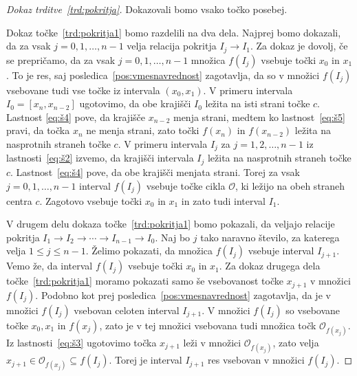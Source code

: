 \documentclass[../TG_magistrsko_delo_sections.tex]{subfiles}
\begin{document}
\begin{proof}[Dokaz trditve~\ref{trd:pokritja}]
Dokazovali bomo vsako točko posebej. 

Dokaz točke~\ref{trd:pokritja1} bomo razdelili na dva dela. Najprej bomo dokazali, da za vsak $j = 0, 1, \dots, n-1$ velja relacija pokritja $I_j \to I_1$. Za dokaz je dovolj, če se prepričamo, da za vsak $j=0, 1, \dots, n-1$ množica $f(I_j)$ vsebuje točki $x_0$ in $x_1$. To je res, saj posledica~\ref{pos:vmesnavrednost} zagotavlja, da so v množici $f(I_j)$ vsebovane tudi vse točke iz intervala $(x_0, x_1)$. V primeru intervala $I_0 = [x_n, x_{n-2}]$ ugotovimo, da obe krajišči $I_0$ ležita na isti strani točke $c$. Lastnost \ref{eq:š4} pove, da krajišče $x_{n-2}$ menja strani, medtem ko lastnost~\ref{eq:š5} pravi, da točka $x_n$ ne menja strani, zato točki $f(x_n)$ in $f(x_{n-2})$ ležita na nasprotnih straneh točke $c$. V primeru intervala $I_j$ za $j = 1, 2, \dots, n-1$ iz lastnosti~\ref{eq:š2} izvemo, da krajišči intervala $I_j$ ležita na nasprotnih straneh točke $c$. Lastnost~\ref{eq:š4} pove, da obe krajišči menjata strani. Torej za vsak $j=0, 1, \dots, n-1$ interval $f(I_j)$ vsebuje točke cikla $\mathcal{O}$, ki ležijo na obeh straneh centra $c$. Zagotovo vsebuje točki $x_0$ in $x_1$ in zato tudi interval $I_1$.

V drugem delu dokaza točke~\ref{trd:pokritja1} bomo pokazali, da veljajo relacije pokritja $I_1 \to I_2 \to \cdots \to I_{n-1} \to I_0$. Naj bo $j$ tako naravno število, za katerega velja $1 \leq j \leq n-1$. Želimo pokazati, da množica $f(I_j)$ vsebuje interval $I_{j+1}$. Vemo že, da interval $f(I_j)$ vsebuje točki $x_0$ in $x_1$. Za dokaz drugega dela točke~\ref{trd:pokritja1} moramo pokazati samo še vsebovanost točke $x_{j+1}$ v množici $f(I_j)$. Podobno kot prej posledica~\ref{pos:vmesnavrednost} zagotavlja, da je v množici $f(I_j)$ vsebovan celoten interval $I_{j+1}$. V množici $f(I_j)$ so vsebovane točke $x_0, x_1$ in $f(x_j)$, zato je v tej množici vsebovana tudi množica točk $\mathcal{O}_{f(x_j)}$. Iz lastnosti~\ref{eq:š3} ugotovimo točka $x_{j+1}$ leži v množici $\mathcal{O}_{f(x_j)}$, zato velja $x_{j+1} \in \mathcal{O}_{f(x_j)} \subseteq f(I_j)$. Torej je interval $I_{j+1}$ res vsebovan v množici $f(I_j)$.


\end{proof}
\end{document}
